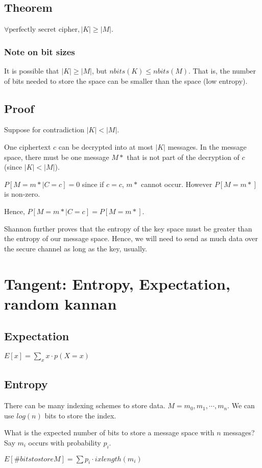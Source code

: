 \subsection{Theorem}
$\forall \text{perfectly secret cipher}, |K| \geq |M|$.
\subsubsection{Note on bit sizes}
It is possible that $|K| \geq |M|$, but $nbits(K) \leq nbits(M)$. That is, the number of bits needed to store the space
can be smaller than the space (low entropy).


\subsection{Proof}

Suppose for contradiction $|K| < |M|$.

One ciphertext $c$ can be decrypted into at most $|K|$ messages.
In the message space, there must be one message $M*$ that is not part of the decryption of $c$ (since $|K| < |M|$).

$P[M=m*|C=c] = 0$ since if $c=c$, $m*$ cannot occur.
However $P[M=m*]$ is non-zero.

Hence,
$P[M=m*|C=c] = P[M=m*]$.

Shannon further proves that the entropy of the key space must be greater than the entropy of our message space.
Hence, we will need to send as much data over the secure channel as long as the key, usually.


\section{Tangent: Entropy, Expectation, random kannan}
\subsection{Expectation}
$E[x] = \sum_x x \cdot p(X=x)$


\subsection{Entropy}
There can be many indexing schemes to store data.
$M = {m_0, m_1, \cdots, m_n}$.
We can use $log(n)$ bits to store the index.

What is the expected number of bits to store a message space with $n$ messages?
Say $m_i$ occurs with probability $p_i$.

$E[\#bits to store M] = \sum p_i \cdot ixlength(m_i)$

